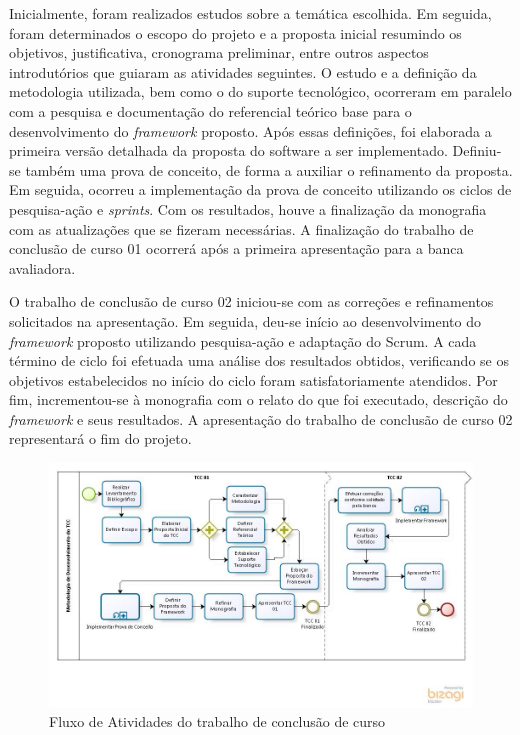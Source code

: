  \par
 \indent Inicialmente, foram realizados estudos sobre a temática escolhida. Em seguida, foram determinados o escopo do projeto e a proposta inicial resumindo os objetivos, justificativa, cronograma preliminar, entre outros aspectos introdutórios que guiaram as atividades seguintes. O estudo e a definição  da metodologia utilizada, bem como o do suporte tecnológico, ocorreram em paralelo com a pesquisa e documentação do referencial teórico base para o desenvolvimento do \textit{framework} proposto. Após essas definições, foi elaborada a primeira versão detalhada da proposta do software a ser implementado. Definiu-se também uma prova de conceito, de forma a auxiliar o refinamento da proposta. Em seguida, ocorreu a implementação da prova de conceito utilizando os ciclos de pesquisa-ação e \textit{sprints}. Com os resultados, houve a finalização da monografia com as atualizações que se fizeram necessárias. A finalização do trabalho de conclusão de curso 01 ocorrerá após a primeira apresentação para a banca avaliadora.
 \par
 \indent O trabalho de conclusão de curso 02 iniciou-se com as correções e refinamentos solicitados na apresentação. Em seguida,  deu-se início ao desenvolvimento do \textit{framework} proposto utilizando pesquisa-ação e adaptação do Scrum. A cada término de ciclo foi efetuada uma análise dos resultados obtidos, verificando se os objetivos estabelecidos no início do ciclo foram satisfatoriamente atendidos. Por fim, incrementou-se à monografia com o relato do que foi executado, descrição do \textit{framework} e seus resultados.  A apresentação do trabalho de conclusão de curso 02 representará o fim do projeto.
 	
  \begin{figure}[h]
    \centering
    \includegraphics[width=\textwidth]{figuras/processo.jpg}
    \caption{Fluxo de Atividades do trabalho de conclusão de curso}
    \label{fig:processo}
  \end{figure}

